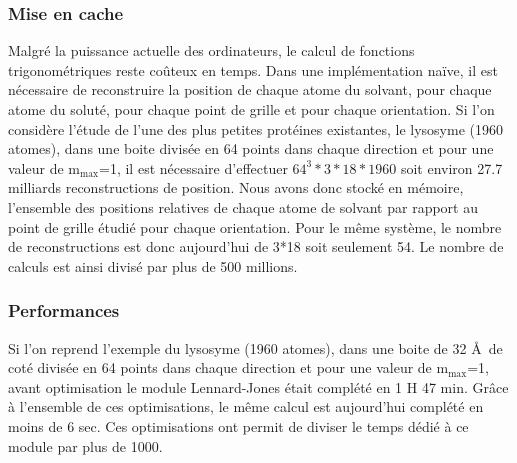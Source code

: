 \subsubsection{Mise en cache}
Malgré la puissance actuelle des ordinateurs, le calcul de fonctions trigonométriques reste coûteux en temps. Dans une implémentation naïve, il est nécessaire de reconstruire la position de chaque atome du solvant, pour chaque atome du soluté, pour chaque point de grille et pour chaque orientation. Si l'on considère l'étude de l'une des plus petites protéines existantes, le lysosyme (1960 atomes), dans une boite divisée en 64 points dans chaque direction et pour une valeur de $\mathrm{m}_\mathrm{max}$=1, il est nécessaire d'effectuer $64^3*3*18*1960$ soit environ 27.7 milliards reconstructions de position. Nous avons donc stocké en mémoire, l'ensemble des positions relatives de chaque atome de solvant par rapport au point de grille étudié pour chaque orientation. Pour le même système, le nombre de reconstructions est donc aujourd'hui de 3*18 soit seulement 54. Le nombre de calculs est ainsi divisé par plus de 500 millions.


\subsubsection{Performances}
Si l'on reprend l'exemple du lysosyme (1960 atomes), dans une boite de 32 \AA\ de coté divisée en 64 points dans chaque direction et pour une valeur de $\mathrm{m}_\mathrm{max}$=1, avant optimisation le module Lennard-Jones était complété en 1 H 47 min. Grâce à l'ensemble de ces optimisations, le même calcul est aujourd'hui complété en moins de 6 sec. Ces optimisations ont permit de diviser le temps dédié à ce module par plus de 1000.

%

%







